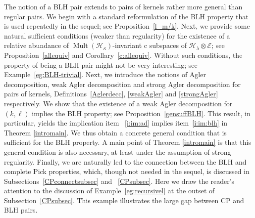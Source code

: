 \documentclass[a4paper,reqno,index]{amsart}
\numberwithin{equation}{section}
\newcommand{\Mult}{\operatorname{Mult}}
\newcommand{\cH}{\mathcal{H}}
\newcommand{\HSE}{\mathcal{E}}
\newcommand{\genk}{\kappa} %
\newcommand{\genl}{\lambda} %
\theoremstyle{definition}
\begin{document}
The notion of a BLH pair extends to pairs of kernels rather more general than regular pairs. We begin with a standard reformulation of the BLH property that is used repeatedly in the sequel; see Proposition~\ref{l_m/k}. Next, we provide some natural sufficient conditions (weaker than regularity) for the existence of a relative 
abundance of  $\Mult(\cH_\genk)$-invariant c subspaces of $\cH_\genl\otimes \HSE$; see Proposition~\ref{allequiv} and Corollary~\ref{c:allequiv}. Without such conditions, the property of being a BLH pair might not be very interesting; see Example~\ref{eg:BLH-trivial}. Next, we introduce the notions of Agler decomposition, weak Agler decomposition and strong Agler decomposition  for pairs of kernels, Definitions~\ref{Aglerdecc}, \ref{weakAgler} and \ref{strongAgler} respectively. We show that the existence of a weak Agler decomposition for $(k, \ell)$ implies the BLH property; see Proposition~\ref{gensuffBLH}. This result, in particular, yields the implication item ~\ref{i:im:ad} implies item~\ref{i:im:blh} in Theorem \ref{intromain}. We thus obtain a concrete general condition that is sufficient for the BLH property. A main point of Theorem \ref{intromain} is that this general condition is also necessary, at least under the assumption of strong regularity. Finally, we are naturally led to the connection between the BLH and complete Pick properties, which, though 
not needed in the sequel, is discussed in Subsections~\ref{CPconnectsubsec} and ~\ref{CPsubsec}. Here we draw the reader's attention to the discussion
of Example~\ref{eg:recursivel} at the outset of Subsection~\ref{CPsubsec}. This example
illustrates the large gap between CP and BLH pairs.
\end{document}

